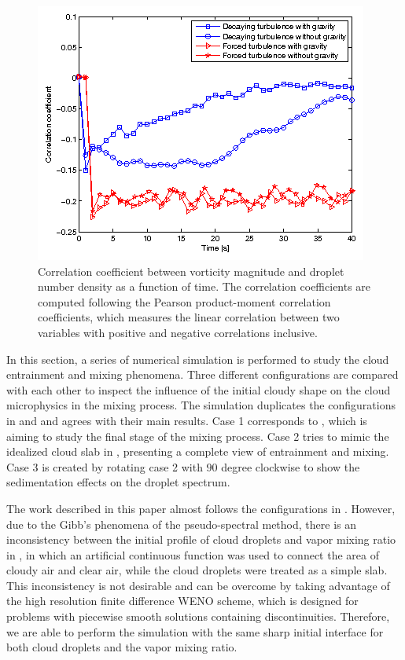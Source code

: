 \begin{figure}[!htbp]\centering
\includegraphics[width=0.6\linewidth]{Figures/correlation}
\caption{Correlation coefficient between vorticity magnitude and droplet number density as a function of time. The correlation coefficients are computed following the Pearson product-moment correlation coefficients, which measures the linear correlation between two variables with positive and negative correlations inclusive.\label{fig:correlation}}
\end{figure}

In this section, a series of numerical simulation is performed to study the cloud entrainment and mixing phenomena. Three different configurations are compared with each other to inspect the influence of the initial cloudy shape on the cloud microphysics in the mixing process. The simulation duplicates the configurations in \cite{Andrejczuk2004} and \cite{Kumar2012Cloud} and agrees with their main results. Case 1 corresponds to \cite{Andrejczuk2004}, which is aiming to study the final stage of the mixing process. Case 2 tries to mimic the idealized cloud slab in \cite{Kumar2012Cloud}, presenting a complete view of entrainment and mixing. Case 3 is created by rotating case 2 with $90$ degree clockwise to show the sedimentation effects on the droplet spectrum.

The work described in this paper almost follows the configurations in \cite{Kumar2012Cloud}. However, due to the Gibb's phenomena of the pseudo-spectral method, there is an inconsistency between the initial profile of cloud droplets and vapor mixing ratio in \cite{Kumar2012Cloud}, in which an artificial continuous function was used to connect the area of cloudy air and clear air, while the cloud droplets were treated as a simple slab. This inconsistency is not desirable and can be overcome by taking advantage of the high resolution finite difference WENO scheme, which is designed for problems with piecewise smooth solutions containing discontinuities. Therefore, we are able to perform the simulation with the same sharp initial interface for both cloud droplets and the vapor mixing ratio.

